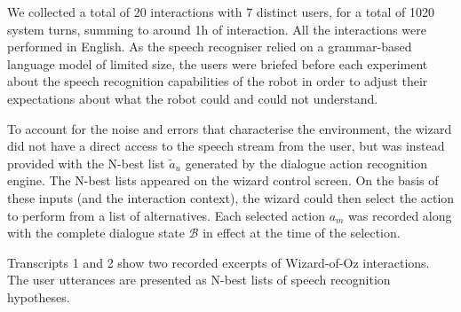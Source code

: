 We collected a total of 20 interactions with 7 distinct users, for a total of 1020 system turns, summing to around 1h of interaction.  All the interactions were performed in English.  As the speech recogniser relied on a grammar-based language model of limited size, the users were briefed before each experiment about the speech recognition capabilities of the robot in order to adjust their expectations about what the robot could and could not understand. 

To account for the noise and errors that characterise the environment, the wizard did not have a direct access to the speech stream from the user, but was instead provided with the N-best list $\tilde{a}_u$ generated by the dialogue action recognition engine.  The N-best lists appeared on the wizard control screen. On the basis of these inputs (and the interaction context), the wizard could then  select the action to perform from a list of alternatives.  Each selected action $a_m$ was recorded along with the complete dialogue state $\mathcal{B}$ in effect at the time of the selection.

Transcripts 1 and 2 show two recorded excerpts of Wizard-of-Oz interactions.  The user utterances are presented as N-best lists of speech recognition hypotheses. 

